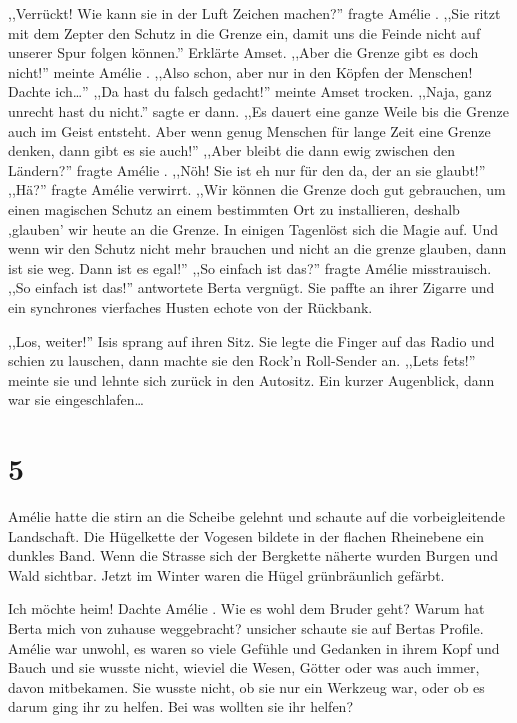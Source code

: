 \documentclass[11pt,titlepage,a5paper]{book}
\newcommand{\am}{Amélie }
\begin{document}
,,Verrückt! Wie kann sie in der Luft Zeichen machen?'' fragte \am . ,,Sie ritzt mit dem Zepter den Schutz in die Grenze ein, damit uns die Feinde nicht auf unserer Spur folgen können.'' Erklärte Amset. ,,Aber die Grenze gibt es doch nicht!'' meinte \am . ,,Also schon, aber nur in den Köpfen der Menschen! Dachte ich\dots '' ,,Da hast du falsch gedacht!'' meinte Amset trocken. ,,Naja, ganz unrecht hast du nicht.'' sagte er dann. ,,Es dauert eine ganze Weile bis die Grenze auch im Geist entsteht. Aber wenn genug Menschen für lange Zeit eine Grenze denken, dann gibt es sie auch!'' ,,Aber bleibt die dann ewig zwischen den Ländern?'' fragte \am . ,,Nöh! Sie ist eh nur für den da, der an sie glaubt!'' ,,Hä?'' fragte \am verwirrt. ,,Wir können die Grenze doch gut gebrauchen, um einen magischen Schutz an einem bestimmten Ort zu installieren, deshalb ,glauben' wir heute an die Grenze. In einigen Tagenlöst sich die Magie auf. Und wenn wir den Schutz nicht mehr brauchen und nicht an die grenze glauben, dann ist sie weg. Dann ist es egal!'' ,,So einfach ist das?'' fragte \am misstrauisch. ,,So einfach ist das!'' antwortete Berta vergnügt. Sie paffte an ihrer Zigarre und ein synchrones vierfaches Husten echote von der Rückbank.

,,Los, weiter!'' Isis sprang auf ihren Sitz. Sie legte die Finger auf das Radio und schien zu lauschen, dann machte sie den Rock'n Roll-Sender an. ,,Lets fets!'' meinte sie und lehnte sich zurück in den Autositz. Ein kurzer Augenblick, dann war sie eingeschlafen\dots

\section*{5}

\am hatte die stirn an die Scheibe gelehnt und schaute auf die vorbeigleitende Landschaft. Die Hügelkette der Vogesen bildete in der flachen Rheinebene ein dunkles Band. Wenn die Strasse sich der Bergkette näherte wurden Burgen und Wald sichtbar. Jetzt im Winter waren die Hügel grünbräunlich gefärbt.

Ich möchte heim! Dachte \am . Wie es wohl dem Bruder geht? Warum hat Berta mich von zuhause weggebracht? unsicher schaute sie auf Bertas Profile. \am war unwohl, es waren so viele Gefühle und Gedanken in ihrem Kopf und  Bauch und sie wusste nicht, wieviel die Wesen, Götter oder was auch immer, davon mitbekamen. Sie wusste nicht, ob sie nur ein Werkzeug war, oder ob es darum ging ihr zu helfen. Bei was wollten sie ihr helfen? 
\end{document}
